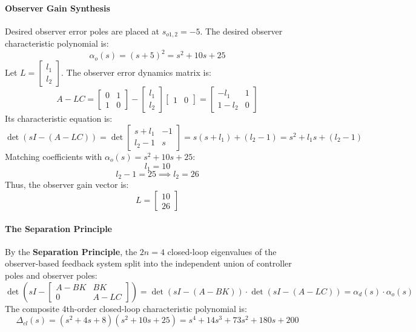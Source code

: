 \documentclass[12pt,onecolumn,twoside ]{article}
\begin{document}
	\paragraph{Observer Gain Synthesis}
	Desired observer error poles are placed at $s_{o1,2} = -5$. The desired observer characteristic polynomial is: \[
	\alpha_o(s) = (s + 5)^2 = s^2 + 10s + 25
	\]
	Let $L = \begin{bmatrix} l_1 \\ l_2 \end{bmatrix}$. The observer error dynamics matrix is: \[
	A - LC = \begin{bmatrix} 0 & 1 \\ 1 & 0 \end{bmatrix} - \begin{bmatrix} l_1 \\ l_2 \end{bmatrix} \begin{bmatrix} 1 & 0 \end{bmatrix} = \begin{bmatrix} -l_1 & 1 \\ 1 - l_2 & 0 \end{bmatrix}
	\]
	Its characteristic equation is: \[
	\det(sI - (A - LC)) = \det \begin{bmatrix} s + l_1 & -1 \\ l_2 - 1 & s \end{bmatrix} = s(s + l_1) + (l_2 - 1) = s^2 + l_1 s + (l_2 - 1)
	\]
	Matching coefficients with $\alpha_o(s) = s^2 + 10s + 25$: \[
	l_1 = 10
	\] \[
	l_2 - 1 = 25 \implies l_2 = 26
	\]
	Thus, the observer gain vector is: \[
	L = \begin{bmatrix} 10 \\ 26 \end{bmatrix}
	\]
	\paragraph{The Separation Principle}
	By the \textbf{Separation Principle}, the $2n = 4$ closed-loop eigenvalues of the observer-based feedback system split into the independent union of controller poles and observer poles: \[
	\det \left( sI - \begin{bmatrix} A - BK & BK \\ 0 & A - LC \end{bmatrix} \right) = \det(sI - (A - BK)) \cdot \det(sI - (A - LC)) = \alpha_d(s) \cdot \alpha_o(s)
	\]
	The composite 4th-order closed-loop characteristic polynomial is: \[
	\Delta_{cl}(s) = (s^2 + 4s + 8)(s^2 + 10s + 25) = s^4 + 14s^3 + 73s^2 + 180s + 200
	\]
\end{document}
